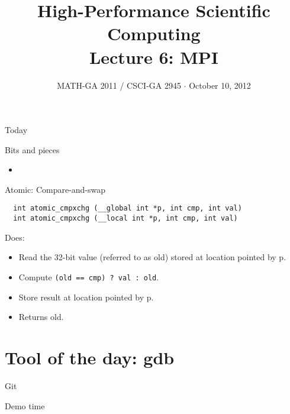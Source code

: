 \documentclass[english,compress]{beamer}
\begin{document}

\title{High-Performance Scientific Computing\\Lecture 6: MPI}

\date{MATH-GA 2011 / CSCI-GA 2945 $\cdot$ October 10, 2012}

\frame{\titlepage}

\begin{frame}{Today}
  \tableofcontents[hideallsubsections]
\end{frame}
\begin{frame}{Bits and pieces}
  \begin{itemize}
    \item 
  \end{itemize}
\end{frame}
\begin{frame}[fragile]{Atomic: Compare-and-swap}
  \begin{lstlisting}
  int atomic_cmpxchg (__global int *p, int cmp, int val)
  int atomic_cmpxchg (__local int *p, int cmp, int val)
  \end{lstlisting}

  Does:
  \begin{itemize}
    \item Read the 32-bit value (referred to as
    old) stored at location pointed by p.
  \item Compute \texttt{(old == cmp) ? val : old}.
  \item Store result at location pointed by p.
  \item Returns old.
  \end{itemize}
\end{frame}
\section{Tool of the day: gdb}
\begin{frame}{Git}
  \begin{center}
  \Huge Demo time
  \end{center}
\end{frame}
\end{document}
